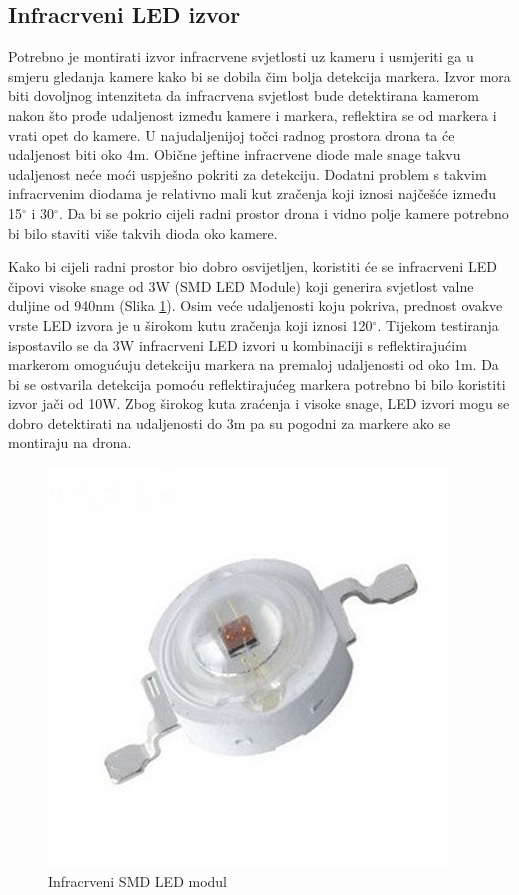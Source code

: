 \documentclass[times, utf8, diplomski]{fer}
\begin{document}
\subsection{Infracrveni LED izvor}
Potrebno je montirati izvor infracrvene svjetlosti uz kameru i usmjeriti ga u smjeru gledanja kamere kako bi se dobila čim bolja detekcija markera. Izvor mora biti dovoljnog intenziteta da infracrvena svjetlost bude detektirana kamerom nakon što prođe udaljenost između kamere i markera, reflektira se od markera i vrati opet do kamere. U najudaljenijoj točci radnog prostora drona ta će udaljenost biti oko 4m. Obične jeftine infracrvene diode male snage takvu udaljenost neće moći uspješno pokriti za detekciju. Dodatni problem s takvim infracrvenim diodama je relativno mali kut zračenja koji iznosi najčešće između 15$^{\circ}$ i 30$^{\circ}$. Da bi se pokrio cijeli radni prostor drona i vidno polje kamere potrebno bi bilo staviti više takvih dioda oko kamere.

Kako bi cijeli radni prostor bio dobro osvijetljen, koristiti će se infracrveni LED čipovi visoke snage od 3W (SMD LED Module) koji generira svjetlost valne duljine od 940nm (Slika \ref{fig:led}). Osim veće udaljenosti koju pokriva, prednost ovakve vrste LED izvora je u širokom kutu zračenja koji iznosi 120$^{\circ}$. Tijekom testiranja ispostavilo se da 3W infracrveni LED izvori u kombinaciji s reflektirajućim markerom omogućuju detekciju markera na premaloj udaljenosti od oko 1m. Da bi se ostvarila detekcija pomoću reflektirajućeg markera potrebno bi bilo koristiti izvor jači od 10W. Zbog širokog kuta zraćenja i visoke snage, LED izvori mogu se dobro detektirati na udaljenosti do 3m pa su pogodni za markere ako se montiraju na drona.

\begin{figure}[h]
\centering
\includegraphics[width=.4\textwidth]{infrared_led}
\caption{Infracrveni SMD LED modul}
\label{fig:led}
\end{figure}
\end{document}
